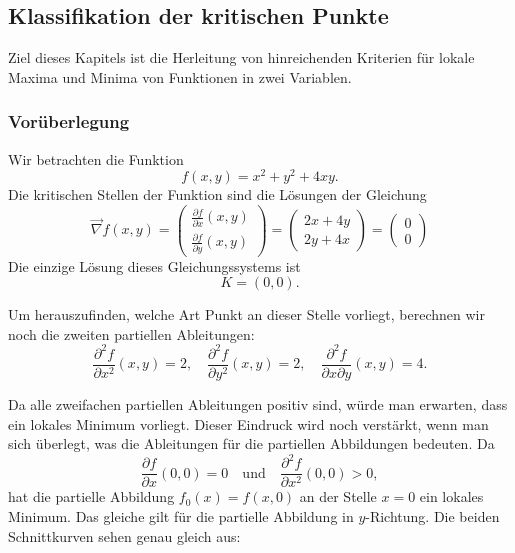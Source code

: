 \clearpage
\subsection{Klassifikation der kritischen Punkte}
\label{sec:klassifikation}
Ziel dieses Kapitels ist die Herleitung von hinreichenden Kriterien für lokale Maxima und Minima von Funktionen in zwei Variablen.

\subsubsection*{Vorüberlegung}
Wir betrachten die Funktion
\[
	f(x,y) = x^2 + y^2 + 4xy.
\]
Die kritischen Stellen der Funktion sind die Lösungen der Gleichung
\[
	\vec{\nabla} f(x,y) =
	\begin{pmatrix}
		\frac{\partial f}{\partial x}(x,y) \\
		\frac{\partial f}{\partial y}(x,y)
	\end{pmatrix}
	=
	\begin{pmatrix}
		2x + 4y \\
		2y + 4x
	\end{pmatrix}
	=
	\begin{pmatrix}
		0 \\
		0
	\end{pmatrix}
\]
Die einzige Lösung dieses Gleichungssystems ist
\[
	K = (0,0).
\]

Um herauszufinden, welche Art Punkt an dieser Stelle vorliegt, berechnen wir noch die zweiten partiellen Ableitungen:
\[
	\frac{\partial^2 f}{\partial x^2}(x,y) = 2, \quad
	\frac{\partial^2 f}{\partial y^2}(x,y) = 2, \quad
	\frac{\partial^2 f}{\partial x \partial y}(x,y) = 4.
\]

Da alle zweifachen partiellen Ableitungen positiv sind, würde man erwarten, dass ein lokales Minimum vorliegt. Dieser Eindruck wird noch verstärkt, wenn man sich überlegt, was die Ableitungen für die partiellen Abbildungen bedeuten. Da
\[
	\frac{\partial f}{\partial x}(0,0) = 0 \quad \text{und} \quad \frac{\partial^2 f}{\partial x^2}(0,0) > 0,
\]
hat die partielle Abbildung \(f_0(x) = f(x,0)\) an der Stelle \(x = 0\) ein lokales Minimum. Das gleiche gilt für die partielle Abbildung in \(y\)-Richtung. Die beiden Schnittkurven sehen genau gleich aus:

\begin{center}
	\qquad
\end{center}

